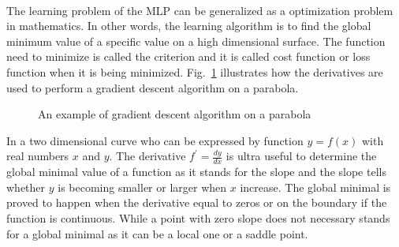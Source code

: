 \paragraph{}
The learning problem of the MLP can be generalized as a optimization problem in mathematics.
In other words, the learning algorithm is to find the global minimum value of a specific value on a high dimensional surface.
The function need to minimize is called the criterion and it is called cost function or loss function when it is being minimized.
Fig.~\ref{lr_fig:ml_gradient_optimization} illustrates how the derivatives are used to perform a gradient descent algorithm on a parabola.
\begin{figure}
    \centering
    \caption{An example of gradient descent algorithm on a parabola}
    \label{lr_fig:ml_gradient_optimization}
\end{figure}
%
In a two dimensional curve who can be expressed by function $y=f(x)$ with real numbers $x$ and $y$.
The derivative $f^\prime=\frac{dy}{dx}$ is ultra useful to determine the global minimal value of a function as it stands for the slope and the slope tells whether $y$ is becoming smaller or larger when $x$ increase.
The global minimal is proved to happen when the derivative equal to zeros or on the boundary if the function is continuous.
While a point with zero slope does not necessary stands for a global minimal as it can be a local one or a saddle point.
